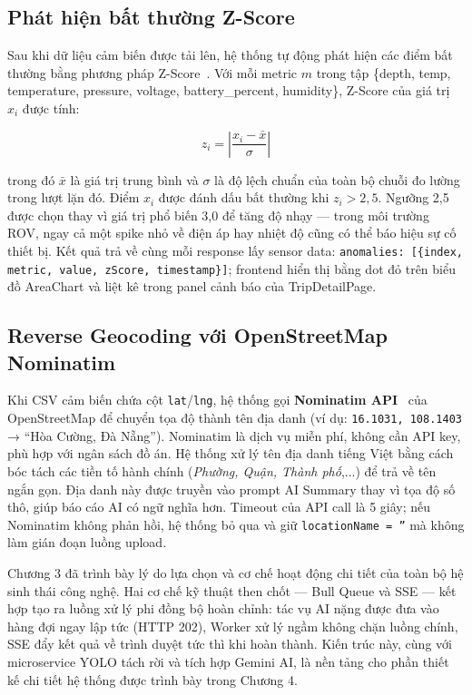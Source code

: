 \documentclass[../DoAn.tex]{subfiles}
\begin{document}
\subsection{Phát hiện bất thường Z-Score}

Sau khi dữ liệu cảm biến được tải lên, hệ thống tự động phát hiện các điểm bất thường bằng phương pháp Z-Score~\cite{zscore_grubbs}. Với mỗi metric $m$ trong tập \{depth, temp, temperature, pressure, voltage, battery\_percent, humidity\}, Z-Score của giá trị $x_i$ được tính:

\[
z_i = \left| \frac{x_i - \bar{x}}{\sigma} \right|
\]

trong đó $\bar{x}$ là giá trị trung bình và $\sigma$ là độ lệch chuẩn của toàn bộ chuỗi đo lường trong lượt lặn đó. Điểm $x_i$ được đánh dấu bất thường khi $z_i > 2{,}5$. Ngưỡng 2,5 được chọn thay vì giá trị phổ biến 3,0 để tăng độ nhạy --- trong môi trường ROV, ngay cả một spike nhỏ về điện áp hay nhiệt độ cũng có thể báo hiệu sự cố thiết bị. Kết quả trả về cùng mỗi response lấy sensor data: \texttt{anomalies:\allowbreak{} [\{index, metric, value,\allowbreak{} zScore, timestamp\}]}; frontend hiển thị bằng dot đỏ trên biểu đồ AreaChart và liệt kê trong panel cảnh báo của TripDetailPage.

\subsection{Reverse Geocoding với OpenStreetMap Nominatim}

Khi CSV cảm biến chứa cột \texttt{lat}/\texttt{lng}, hệ thống gọi \textbf{Nominatim API}~\cite{nominatim} của OpenStreetMap để chuyển tọa độ thành tên địa danh (ví dụ: \texttt{16.1031, 108.1403} → ``Hòa Cường, Đà Nẵng''). Nominatim là dịch vụ miễn phí, không cần API key, phù hợp với ngân sách đồ án. Hệ thống xử lý tên địa danh tiếng Việt bằng cách bóc tách các tiền tố hành chính (\textit{Phường, Quận, Thành phố},...) để trả về tên ngắn gọn. Địa danh này được truyền vào prompt AI Summary thay vì tọa độ số thô, giúp báo cáo AI có ngữ nghĩa hơn. Timeout của API call là 5 giây; nếu Nominatim không phản hồi, hệ thống bỏ qua và giữ \texttt{locationName = ''} mà không làm gián đoạn luồng upload.

Chương 3 đã trình bày lý do lựa chọn và cơ chế hoạt động chi tiết của toàn bộ hệ sinh thái công nghệ. Hai cơ chế kỹ thuật then chốt --- Bull Queue và SSE --- kết hợp tạo ra luồng xử lý phi đồng bộ hoàn chỉnh: tác vụ AI nặng được đưa vào hàng đợi ngay lập tức (HTTP 202), Worker xử lý ngầm không chặn luồng chính, SSE đẩy kết quả về trình duyệt tức thì khi hoàn thành. Kiến trúc này, cùng với microservice YOLO tách rời và tích hợp Gemini AI, là nền tảng cho phần thiết kế chi tiết hệ thống được trình bày trong Chương 4.
\end{document}
